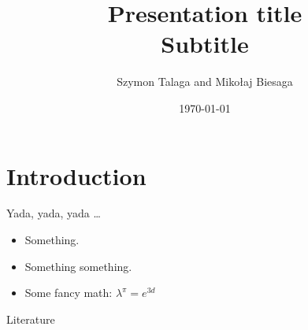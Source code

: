 \title[Presentation]{
    Presentation title \\
    \small{Subtitle}
}
\author[]{Szymon Talaga and Mikołaj Biesaga} %
\date{\today} %

\frame{\titlepage}

\section{Introduction}

\begin{frame}{Yada, yada, yada \ldots}
\begin{itemize}
    \item Something.
    \item Something something.
    \item Some fancy math: $\lambda^\pi = e^{3d}$
\end{itemize}
\end{frame}

\begin{frame}{Literature}
\nocite{*}
\AtNextBibliography{\footnotesize}
\printbibliography
\end{frame}

